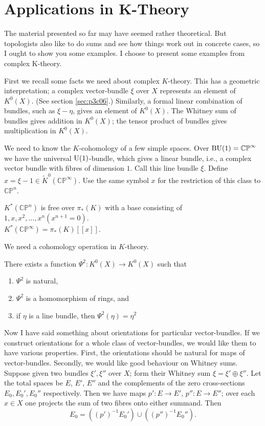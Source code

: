 \documentclass[../main]{subfiles}
\begin{document}
\chapter{Applications in K-Theory}
\label{sec:p3c11}
The material presented so far may have seemed rather theoretical. But topologists also like to do sums and see how things work out in concrete cases, so I ought to show you some examples. I choose to present some examples from complex K-theory.
\par First we recall some facts we need about complex $K$-theory. This has a geometric interpretation; a complex vector-bundle $\xi$ over $X$ represents an element of $K^0(X)$. (See section \ref{sec:p3c06}.) Similarly, a formal linear combination of bundles, such as $\xi-\eta$, gives an element of $K^0(X)$. The Whitney sum of bundles gives addition in $K^0(X)$;  the tensor product of bundles gives multiplication in $K^0(X)$.
\par We need to know the $K$-cohomology of a few simple spaces. Over $\mathrm{BU}(1)=\mathbb{CP}^\infty$ we have the universal $\mathrm{U}(1)$-bundle, which gives a linear bundle, i.e., a complex vector bundle with fibres of dimension $1$. Call this line bundle $\xi$. Define $x=\xi - 1 \in \tilde{K}^0(\mathbb{CP}^\infty)$. Use the same symbol $x$ for the restriction of this class to $\mathbb{CP}^n$.
\begin{proposition}\label{prop:p3ch11.1}
$K^\ast (\mathbb{CP}^n)$ is free over $\pi_\ast (K)$ with a base consisting of $1,x,x^2,...,x^n (x^{n+1}=0)$. \\$K^\ast (\mathbb{CP}^\infty)=\pi_\ast (K)[[x]].$
\end{proposition}
\par We need a cohomology operation in $K$-theory.
\begin{proposition}\label{prop:p3ch11.2}
There exists a function $\Psi^2:K^0(X)\longrightarrow K^0(X)$ such that \begin{enumerate}
    \item $\Psi^2$ is natural,
    \item $\Psi^2$ is a homomorphism of rings, and
    \item if $\eta$ is a line bundle, then $\Psi^2(\eta)=\eta^2$
\end{enumerate}
\end{proposition}
\par Now I have said something about orientations for particular vector-bundles. If we construct orientations for a whole class of vector-bundles, we would like them to have various properties. First, the orientations should be natural for maps of vector-bundles. Secondly, we would like good behaviour on Whitney sums. Suppose given two bundles $\xi',\xi''$ over $X$; form their Whitney sum $\xi=\xi'\oplus\xi''$. Let the total spaces be $E$, $E'$, $E''$ and the complements of the zero cross-sections $E_0, E_0', E_0''$ respectively. Then we have maps $p':E\longrightarrow E'$, $p'':E\longrightarrow E''$; over each $x\in X$ one projects the sum of two fibres onto either summand. Then \[E_0=((p')^{-1}E_0')\cup ((p'')^{-1}E_0'').\]
\end{document}
